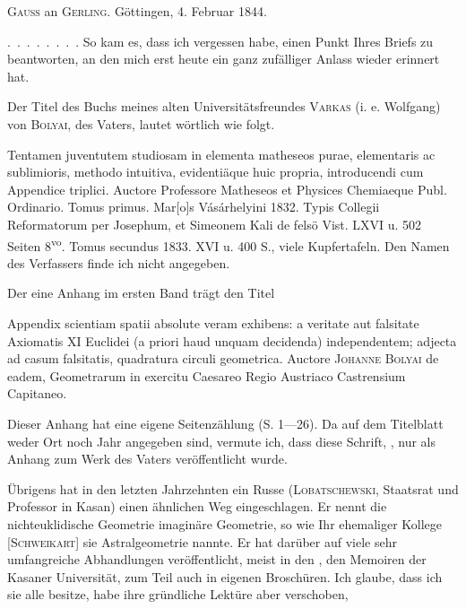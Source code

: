 %
\begin{center}\textsc{Gauss} an \textsc{Gerling}. Göttingen, 4. Februar 1844.\end{center}

\mbox{.\ .\ .\ .\ .\ .\ .\ .} So kam es, dass ich vergessen habe, einen  Punkt Ihres Briefs zu beantworten, an den mich erst heute ein ganz zufälliger Anlass wieder erinnert hat.

Der Titel des Buchs meines alten Universitätsfreundes \textsc{Varkas} (i. e. Wolfgang) von \textsc{Bolyai}, des Vaters, lautet wörtlich wie folgt.

Tentamen juventutem studiosam in elementa matheseos purae, elementaris ac sublimioris, methodo intuitiva, evidenti\"aque huic propria, introducendi cum Appendice triplici. Auctore Professore Matheseos et Physices Chemiaeque Publ. Ordinario. Tomus primus. Mar[o]s Vásárhelyini 1832. Typis Collegii Reformatorum per Josephum, et Simeonem Kali de felsö Vist. LXVI u. 502 Seiten 8\textsuperscript{vo}. Tomus secundus 1833. XVI u. 400 S., viele Kupfertafeln. Den Namen des Verfassers finde ich nicht angegeben.

Der eine Anhang im ersten Band trägt den Titel

Appendix scientiam spatii absolute veram exhibens: a veritate aut falsitate Axiomatis XI Euclidei (a priori haud unquam decidenda) independentem; adjecta ad casum falsitatis, quadratura circuli geometrica. Auctore \textsc{Johanne} \textsc{Bolyai} de eadem, Geometrarum in exercitu Caesareo Regio Austriaco Castrensium Capitaneo.

Dieser Anhang hat eine eigene Seitenzählung (S. 1---26). Da auf dem Titelblatt weder Ort noch Jahr angegeben sind, vermute ich, dass diese Schrift, , nur als Anhang zum Werk des Vaters veröffentlicht wurde.

Übrigens hat in den letzten Jahrzehnten ein Russe (\textsc{Lobatschewski}, Staatsrat und Professor in Kasan) einen ähnlichen Weg eingeschlagen. Er nennt die nichteuklidische Geometrie imaginäre Geometrie, so wie Ihr ehemaliger Kollege [\textsc{Schweikart}] sie Astralgeometrie nannte. Er hat darüber auf  viele sehr umfangreiche Abhandlungen veröffentlicht, meist in den , den Memoiren der Kasaner Universität, zum Teil auch in eigenen Broschüren. Ich glaube, dass ich sie alle besitze, habe ihre gründliche Lektüre aber verschoben,
